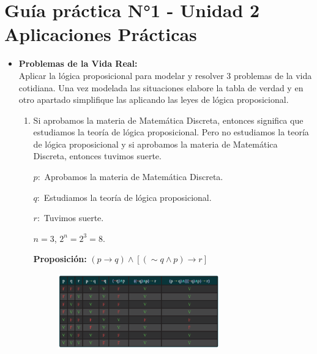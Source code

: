\documentclass[12pt]{article}
\begin{document}
    
  
    \section*{\centering Guía práctica N°1 - Unidad 2\\Aplicaciones Prácticas}

        \vspace{0.6cm}
        \begin{itemize}
            \item \textbf{Problemas de la Vida Real:} \\Aplicar la lógica proposicional para modelar y resolver 3 problemas de la vida cotidiana. Una vez modelada las situaciones elabore la tabla de verdad y en otro apartado simplifique las aplicando las leyes de lógica proposicional.
                \begin{enumerate}
                    \item Si aprobamos la materia de Matemática Discreta, entonces significa que estudiamos la teoría de lógica proposicional. Pero no estudiamos la teoría de lógica proposicional y si aprobamos la materia de Matemática Discreta, entonces tuvimos suerte.
                        \par$p:$ Aprobamos la materia de Matemática Discreta.
                        \par$q:$ Estudiamos la teoría de lógica proposicional.
                        \par$r:$ Tuvimos suerte.
                        \par$n = 3$, $2^n = 2^3 = 8.$ \vspace{0.5cm}
                        \par\textbf{Proposición: }$(p \longrightarrow q) \wedge [(\sim q \wedge p) \longrightarrow r]$\vspace{0.5cm}

                        \begin{figure}[!h]
                            \centering
                            \includegraphics[width=0.7\textwidth]{Img/Tarea8_a_ej1.png}
                        \end{figure} \vspace{0.5cm}


\end{enumerate}
\end{itemize}
\end{document}
